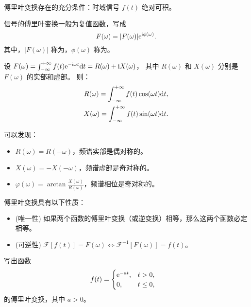 \begin{remark}
    傅里叶变换存在的充分条件：时域信号 $f(t)$ 绝对可积。
\end{remark}

\begin{definition}[傅里叶频谱]
    信号的傅里叶变换一般为复值函数，写成
    \begin{equation}
        F(\omega) = |F(\omega)|\mathrm{e}^{\mathrm{i}\phi(\omega)}.
    \end{equation}
    其中，$|F(\omega)|$ 称为，$\phi(\omega)$ 称为。
\end{definition}

\begin{example}
    设 $F(\omega) = \int_{-\infty}^{+\infty}f(t)\mathrm{e}^{-\mathrm{i} \omega t}\mathrm{d}t = R(\omega) + \mathrm{i} X(\omega)$，
    其中 $R(\omega)$ 和 $X(\omega)$ 分别是 $F(\omega)$ 的实部和虚部。
    则：
    \begin{align*}
        R(\omega) = \int_{-\infty}^{+\infty} f(t)\cos(\omega t)\mathrm{d}t, \\
        X(\omega) = \int_{-\infty}^{+\infty} f(t)\sin(\omega t)\mathrm{d}t.
    \end{align*}

    可以发现：
    \begin{itemize}
        \item $R(\omega) = R(-\omega)$，频谱实部是偶对称的。
        \item $X(\omega) = -X(-\omega)$，频谱虚部是奇对称的。
        \item $\varphi(\omega) = \arctan\frac{X(\omega)}{R(\omega)}$，频谱相位是奇对称的。
    \end{itemize}
\end{example}

\begin{property}[傅里叶变换的性质]
    傅里叶变换具有以下性质：
    \begin{itemize}
        \item (唯一性) 如果两个函数的傅里叶变换（或逆变换）相等，那么这两个函数必定相等。
        \item (可逆性) $\mathcal{F}[f(t)] = F(\omega) \iff \mathcal{F}^{-1}[F(\omega)] = f(t)$。
    \end{itemize}
\end{property}

\begin{exercise}
    写出函数
    \begin{align*}
        f(t) &= \begin{cases}
            \mathrm{e}^{-at}, & t > 0, \\
            0, & t \leq 0,
        \end{cases}
    \end{align*}
    的傅里叶变换，其中 $a > 0$。
\end{exercise}

